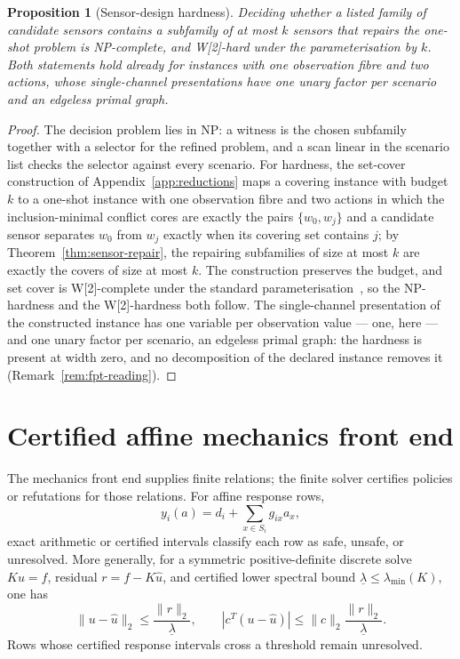 \documentclass[11pt]{article}
\theoremstyle{plain}
\newtheorem{proposition}[theorem]{Proposition}
\theoremstyle{definition}
\theoremstyle{remark}
\begin{document}
\begin{proposition}[Sensor-design hardness]
\label{prop:sensor-design-hardness}
Deciding whether a listed family of candidate sensors contains a subfamily of
at most \(k\) sensors that repairs the one-shot problem is NP-complete, and
W[2]-hard under the parameterisation by \(k\).  Both statements hold already
for instances with one observation fibre and two actions, whose single-channel
presentations have one unary factor per scenario and an edgeless primal graph.
\end{proposition}

\begin{proof}
The decision problem lies in NP: a witness is the chosen subfamily together
with a selector for the refined problem, and a scan linear in the scenario
list checks the selector against every scenario.  For hardness, the set-cover
construction of Appendix~\ref{app:reductions} maps a covering instance with
budget \(k\) to a one-shot instance with one observation fibre and two
actions in which the inclusion-minimal conflict cores are exactly the pairs
\(\{w_0,w_j\}\) and a candidate sensor separates \(w_0\) from \(w_j\)
exactly when its covering set contains \(j\); by
Theorem~\ref{thm:sensor-repair}, the repairing subfamilies of size at most
\(k\) are exactly the covers of size at most \(k\).  The construction
preserves the budget, and set cover is W[2]-complete under the standard
parameterisation~\cite{downey-fellows99}, so the NP-hardness and the
W[2]-hardness both follow.  The single-channel presentation of the
constructed instance has one variable per observation value --- one, here ---
and one unary factor per scenario, an edgeless primal graph: the hardness is
present at width zero, and no decomposition of the declared instance removes
it (Remark~\ref{rem:fpt-reading}).
\end{proof}

\section{Certified affine mechanics front end}
\label{sec:mechanics-front-end}

The mechanics front end supplies finite relations; the finite solver certifies
policies or refutations for those relations.  For affine response rows,
\[
  y_i(a)=d_i+\sum_{x\in S_i}g_{ix}a_x,
\]
exact arithmetic or certified intervals classify each row as safe, unsafe, or
unresolved.  More generally, for a symmetric positive-definite discrete solve
\(Ku=f\), residual \(r=f-K\widehat u\), and certified lower spectral bound
\(\underline\lambda\le\lambda_{
\min}(K)\), one has
\[
  \|u-\widehat u\|_2\le \frac{\|r\|_2}{\underline\lambda},
  \qquad
  |c^T(u-\widehat u)|\le
  \|c\|_2\frac{\|r\|_2}{\underline\lambda}.
\]
Rows whose certified response intervals cross a threshold remain unresolved.
\end{document}
